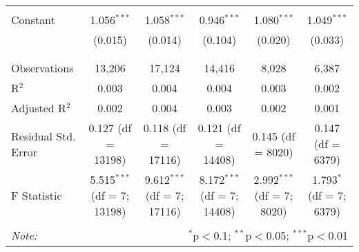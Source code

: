\begin{table}[!htbp]
\begin{adjustbox}{width=\textwidth}
\begin{tabular}{@{\extracolsep{5pt}}lccccc}
  & & & & & \\ 
 Constant & 1.056$^{***}$ & 1.058$^{***}$ & 0.946$^{***}$ & 1.080$^{***}$ & 1.049$^{***}$ \\ 
  & (0.015) & (0.014) & (0.104) & (0.020) & (0.033) \\ 
  & & & & & \\ 
\hline \\[-1.8ex] 
Observations & 13,206 & 17,124 & 14,416 & 8,028 & 6,387 \\ 
R$^{2}$ & 0.003 & 0.004 & 0.004 & 0.003 & 0.002 \\ 
Adjusted R$^{2}$ & 0.002 & 0.004 & 0.003 & 0.002 & 0.001 \\ 
Residual Std. Error & 0.127 (df = 13198) & 0.118 (df = 17116) & 0.121 (df = 14408) & 0.145 (df = 8020) & 0.147 (df = 6379) \\ 
F Statistic & 5.515$^{***}$ (df = 7; 13198) & 9.612$^{***}$ (df = 7; 17116) & 8.172$^{***}$ (df = 7; 14408) & 2.992$^{***}$ (df = 7; 8020) & 1.793$^{*}$ (df = 7; 6379) \\ 
\hline 
\hline \\[-1.8ex] 
\textit{Note:}  & \multicolumn{5}{r}{$^{*}$p$<$0.1; $^{**}$p$<$0.05; $^{***}$p$<$0.01} \\ 
\end{tabular} 
\end{adjustbox}
\end{table} 
